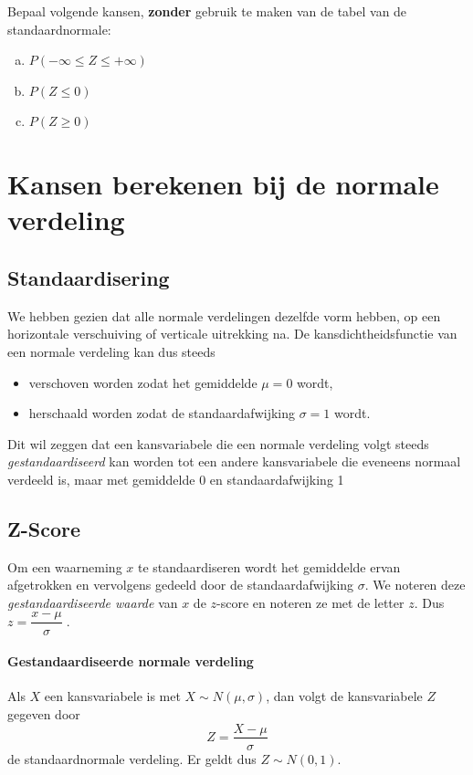 \documentclass[12pt,twoside]{article}
\begin{document}
{\begin{oefening}
Bepaal volgende kansen, {\bf zonder} gebruik te maken van de tabel van de standaardnormale:
\begin{enumerate}[(a)]
  \item $P(-\infty\leq Z \leq +\infty)$
  \item $P(Z\leq 0)$
  \item $P(Z\geq 0)$
\end{enumerate}
\end{oefening}


\pagebreak
\section{Kansen berekenen bij de normale verdeling}

\subsection{Standaardisering}

We hebben gezien dat alle normale verdelingen dezelfde vorm hebben, op een horizontale verschuiving of verticale uitrekking na. De kansdichtheidsfunctie van een normale verdeling kan dus steeds
\begin{itemize}
  \item verschoven worden zodat het gemiddelde $\mu=0$ wordt,
  \item herschaald worden zodat de standaardafwijking $\sigma=1$ wordt.
\end{itemize}

Dit wil zeggen dat een kansvariabele die een normale verdeling volgt steeds {\em gestandaardiseerd} kan worden tot een andere kansvariabele die eveneens normaal verdeeld is, maar met gemiddelde 0 en standaardafwijking 1

\subsection{Z-Score}

Om een waarneming $x$ te standaardiseren wordt het gemiddelde ervan afgetrokken en vervolgens gedeeld door de standaardafwijking $\sigma$. We noteren deze {\em gestandaardiseerde waarde} van $x$ de $z$-score en noteren ze met de letter $z$. Dus
$z=\dfrac{x-\mu}{\sigma}\;.$

\paragraph*{Gestandaardiseerde normale verdeling}
\begin{mdframed}
Als $X$ een kansvariabele is met $X\sim N(\mu,\sigma)$, dan volgt de kansvariabele $Z$ gegeven door
$$Z=\dfrac{X-\mu}{\sigma}$$
de standaardnormale verdeling. Er geldt dus $Z\sim N(0,1)$.
\end{mdframed}

}
\end{document}
